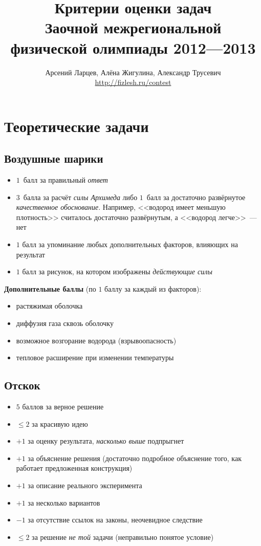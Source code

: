 \documentclass[10pt, a4paper, oneside, fleqn]{article}
\title{Критерии оценки задач\\
Заочной межрегиональной\\
физической олимпиады 2012---2013}
\author{Арсений Ларцев, Алёна Жигулина, Александр Трусевич\\
\url{http://fizlesh.ru/contest}}
\newcommand\т{~--- }
\def\le{\leqslant}
\begin{document}

\maketitle

\section{Теоретические задачи}

\subsection{Воздушные шарики}

\begin{itemize}
\item $1$~балл за правильный \emph{ответ}
\item $3$~балла за расчёт \emph{силы Архимеда} либо $1$~балл за достаточно развёрнутое \emph{качественное обоснование}.
Например, <<водород имеет меньшую плотность>> считалось достаточно развёрнутым, а <<водород легче>>\т нет
\item $1$ балл за упоминание любых дополнительных факторов, влияющих на результат
\item $1$ балл за рисунок, на котором изображены \emph{действующие силы}
\end{itemize}

\textbf{Дополнительные баллы} (по $1$ баллу за каждый из факторов):
\begin{itemize}
\item растяжимая оболочка
\item диффузия газа сквозь оболочку
\item возможное возгорание водорода (взрывоопасность)
\item тепловое расширение при изменении температуры
\end{itemize}

\subsection{Отскок}

\begin{itemize}
\item $5$ баллов за верное решение
\item $\le 2$ за красивую идею
\item $+1$ за оценку результата, \emph{насколько выше} подпрыгнет
\item $+1$ за объяснение решения (достаточно подробное объяснение того, как работает предложенная конструкция)
\item $+1$ за описание реального эксперимента
\item $+1$ за несколько вариантов
\item $-1$ за отсутствие ссылок на законы, неочевидное следствие
\item $\le 2$ за решение \emph{не той} задачи (неправильно понятое условие)
\end{itemize}
\end{document}
